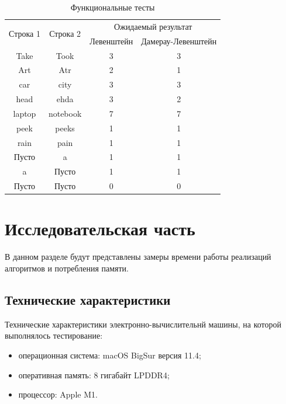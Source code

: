 \documentclass[14pt,russian]{scrartcl}
\begin{document}
\begin{table}[htb]
	\caption{\centering Функциональные тесты}
	\centering
	\begin{tabular}{|c|c|c|c|}
		\hline
		\multirow{2}{*}{Строка 1} & \multirow{2}{*}{Строка 2} & \multicolumn{2}{c|}{Ожидаемый результат} \\ \cline{3-4} 
		&          & Левенштейн & Дамерау-Левенштейн \\ \hline
		Take   & Took     & 3          & 3                   \\ \hline
		Art    & Atr      & 2          & 1                   \\ \hline
		car    & city     & 3          & 3                   \\ \hline
		head   & ehda     & 3          & 2                   \\ \hline
		laptop & notebook & 7          & 7                   \\ \hline
		peek   & peeks    & 1          & 1                   \\ \hline
		rain   & pain     & 1          & 1                   \\ \hline
		Пусто   & a     &   1          & 1                   \\ \hline
		a   & Пусто     &   1          & 1                   \\ \hline
		Пусто   & Пусто     &   0          & 0                   \\ \hline
	\end{tabular}
	\label{tab:func_tests}
\end{table}
	
	\section{Исследовательская часть}
	В данном разделе будут представлены замеры времени работы реализаций алгоритмов и потребления памяти.

	\subsection{Технические характеристики}

	Технические характеристики электронно-вычислительнй машины, на которой выполнялось тестирование:

	\begin{itemize}
		\item операционная система: macOS BigSur версия 11.4;
		\item оперативная память: 8 гигабайт LPDDR4;
		\item процессор: Apple M1.
	\end{itemize}
	
\end{document}
